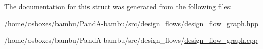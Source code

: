 The documentation for this struct was generated from the following files\+:\begin{DoxyCompactItemize}
\item 
/home/osboxes/bambu/\+Pand\+A-\/bambu/src/design\+\_\+flows/\hyperlink{design__flow__graph_8hpp}{design\+\_\+flow\+\_\+graph.\+hpp}\item 
/home/osboxes/bambu/\+Pand\+A-\/bambu/src/design\+\_\+flows/\hyperlink{design__flow__graph_8cpp}{design\+\_\+flow\+\_\+graph.\+cpp}\end{DoxyCompactItemize}
